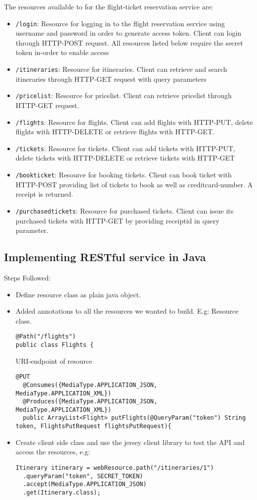 \documentclass[a4paper, 11pt]{article}
\begin{document}
The resources available to for the flight-ticket reservation service are:
\begin{itemize}
\item \texttt{/login}: Resource for logging in to the flight reservation service using username and password in order to generate access token. Client can login through HTTP-POST request. All resources listed below require the secret token in-order to enable access
\item \texttt{/itineraries}: Resource for itineraries. Client can retrieve and search itineraries through HTTP-GET request with query parameters
\item \texttt{/pricelist}: Resource for pricelist. Client can retrieve pricelist through HTTP-GET request.
\item \texttt{/flights}: Resource for flights. Client can add flights with HTTP-PUT, delete flights with HTTP-DELETE or retrieve flights with HTTP-GET.
\item \texttt{/tickets}: Resource for tickets. Client can add tickets with HTTP-PUT, delete tickets with HTTP-DELETE or retrieve tickets with HTTP-GET
\item \texttt{/bookticket}: Resource for booking tickets. Client can book ticket with HTTP-POST providing list of tickets to book as well as creditcard-number. A receipt is returned.
\item \texttt{/purchasedtickets}: Resource for purchased tickets. Client can issue its purchased tickets with HTTP-GET by providing receiptid in query parameter.
\end{itemize}

\subsection*{Implementing RESTful service in Java}
Steps Followed:
\begin{itemize}
\item Define resource class as plain java object. 
\item Added annotations to all the resources we wanted to build. E.g:
Resource class.
 \begin{lstlisting}[frame=single,style=java]
@Path("/flights")
public class Flights {
\end{lstlisting}
\newpage URI-endpoint of resource
\begin{lstlisting}[frame=single,style=java]
  @PUT
  @Consumes({MediaType.APPLICATION_JSON, MediaType.APPLICATION_XML})
  @Produces({MediaType.APPLICATION_JSON, MediaType.APPLICATION_XML})
  public ArrayList<Flight> putFlights(@QueryParam("token") String token, FlightsPutRequest flightsPutRequest){
  \end{lstlisting}
\item Create client side class and use the jersey client library to test the API and access the resources, e.g:
\begin{lstlisting}[frame=single,style=java]
  Itinerary itinerary = webResource.path("/itineraries/1")
  .queryParam("token", SECRET_TOKEN)
  .accept(MediaType.APPLICATION_JSON)
  .get(Itinerary.class);
\end{lstlisting} 
\end{itemize}
\end{document}
